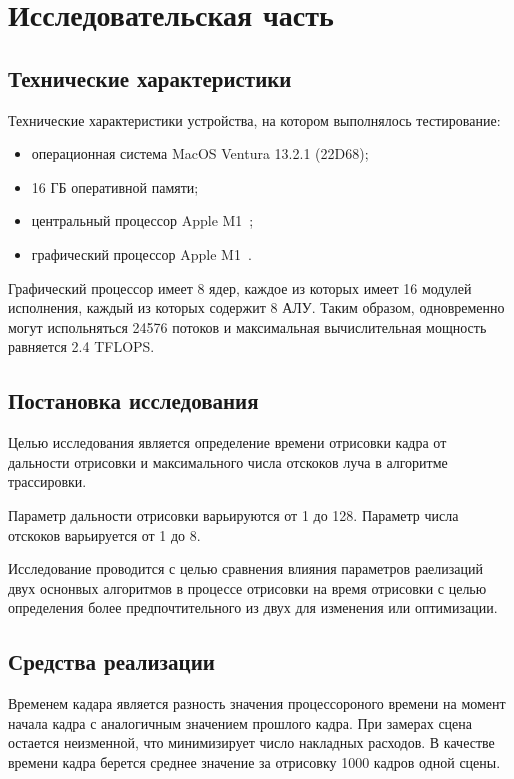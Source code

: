 \chapter{Исследовательская часть}

\section{Технические характеристики}

Технические характеристики устройства, на котором выполнялось тестирование:
\begin{itemize}
    \item операционная система MacOS Ventura 13.2.1 (22D68);
    \item 16 ГБ оперативной памяти;
    \item центральный процессор Apple M1~\cite{M1};
    \item графический процессор Apple M1~\cite{M1}.
\end{itemize}

Графический процессор имеет 8 ядер, каждое из которых имеет 16 модулей 
исполнения, каждый из которых содержит 8 АЛУ. Таким образом, 
одновременно могут испольняться 24576 потоков и максимальная вычислительная мощность
равняется 2.4 TFLOPS.

\section{Постановка исследования}

Целью исследования является определение времени отрисовки кадра 
от дальности отрисовки и максимального числа отскоков луча в алгоритме трассировки.

Параметр дальности отрисовки варьируются от 1 до 128. Параметр числа отскоков 
варьируется от 1 до 8.

Исследование проводится с целью сравнения влияния параметров раелизаций двух 
оснонвых алгоритмов в процессе отрисовки на время отрисовки с целью определения
более предпочтительного из двух для изменения или оптимизации.

\section{Средства реализации}

Временем кадара является разность значения процессороного времени на момент начала кадра с 
аналогичным значением прошлого кадра. При замерах сцена остается неизменной, что
минимизирует число накладных расходов. В качестве времени кадра берется
среднее значение за отрисовку 1000 кадров одной сцены.

